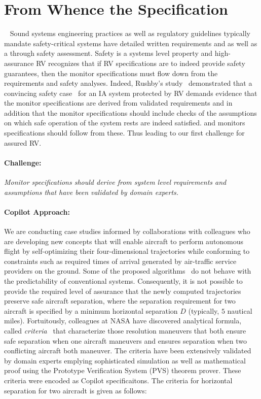 \section{From Whence the Specification}~\label{sec:req}
Sound systems engineering practices  as well
as regulatory guidelines typically mandate safety-critical systems
have detailed written requirements and as well as a through safety
assessment. Safety is a systems level property and  high-assurance RV recognizes
that if RV specifications are to indeed provide safety guarantees,
then the  monitor specifications must flow down from the requirements
and safety analyses.   Indeed, Rushby's study~\cite{rvRushby,RushbyAIAA09} demonstrated
that  a convincing safety case~\cite{Kelly98arguingsafety} for an IA
system protected by RV  demands evidence that the
monitor specifications are  derived from validated requirements and in
addition that the monitor specifications should include checks of the assumptions on
which safe operation of the system rests  are indeed satisfied. 
and monitors specifications should follow from these.
Thus leading to our first challenge for
assured RV.


\paragraph{Challenge:}   \emph{ Monitor specifications should derive from
  system level requirements and assumptions that have been validated
  by domain experts.} 

\paragraph{Copilot Approach:} We are conducting case studies informed
by collaborations with colleagues who are developing new concepts that
will enable aircraft to perform autonomous flight by self-optimizing
their four-dimensional trajectories while conforming to constraints
such as required times of arrival generated by air-traffic service
providers on the ground. Some of the proposed 
algorithms~\cite{KarrVRC} do not  behave with the
predictability of conventional systems.   Consequently, it is not 
possible to provide the required level of assurance that the newly
computed trajectories preserve safe aircraft separation, where the
separation requirement for two aircraft is specified by a minimum
horizontal separation $D$ (typically, $5$ nautical miles).  
Fortuitously, colleagues at NASA have discovered analytical formula,
called \emph{criteria}~\cite{NM2011NASA,NMH14ATIO} that characterize
those resolution maneuvers that both ensure safe separation when one
aircraft maneuvers and ensures separation when two conflicting
aircraft both maneuver. The criteria  have been
extensively validated by domain experts emplying sophisticated
simulation as well as mathematical proof using the Prototype
Verification System (PVS) theorem prover. These criteria were encoded
as Copilot specificaitons. The criteria for horizontal separation for
two aircradt is given as follows:

